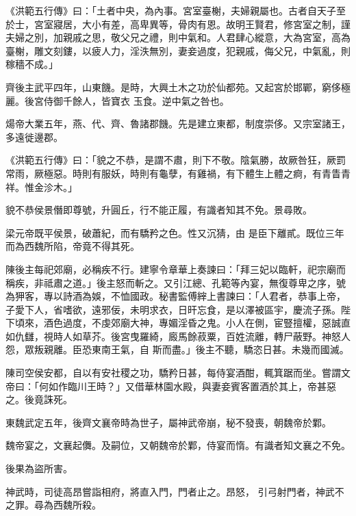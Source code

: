 \begin{pinyinscope}
 《洪範五行傳》曰：「土者中央，為內事。宮室臺榭，夫婦親屬也。古者自天子至於士，宮室寢居，大小有差，高卑異等，骨肉有恩。故明王賢君，修宮室之制，謹夫婦之別，加親戚之思，敬父兄之禮，則中氣和。人君肆心縱意，大為宮室，高為臺榭，雕文刻鏤，以疲人力，淫泆無別，妻妾過度，犯親戚，侮父兄，中氣亂，則稼穡不成。」



 齊後主武平四年，山東饑。是時，大興土木之功於仙都苑。又起宮於邯鄲，窮侈極麗。後宮侍御千餘人，皆寶衣
 玉食。逆中氣之咎也。



 煬帝大業五年，燕、代、齊、魯諸郡饑。先是建立東都，制度崇侈。又宗室諸王，多遠徙邊郡。



 《洪範五行傳》曰：「貌之不恭，是謂不肅，則下不敬。陰氣勝，故厥咎狂，厥罰常雨，厥極惡。時則有服妖，時則有龜孽，有雞禍，有下體生上體之痾，有青眚青祥。惟金沴木。」



 貌不恭侯景僭即尊號，升圓丘，行不能正履，有識者知其不免。景尋敗。



 梁元帝既平侯景，破蕭紀，而有驕矜之色。性又沉猜，由
 是臣下離貳。既位三年而為西魏所陷，帝竟不得其死。



 陳後主每祀郊廟，必稱疾不行。建寧令章華上奏諫曰：「拜三妃以臨軒，祀宗廟而稱疾，非祗肅之道。」後主怒而斬之。又引江總、孔範等內宴，無復尊卑之序，號為狎客，專以詩酒為娛，不恤國政。秘書監傅縡上書諫曰：「人君者，恭事上帝，子愛下人，省嗜欲，遠邪佞，未明求衣，日旰忘食，是以澤被區宇，慶流子孫。陛下頃來，酒色過度，不虔郊廟大神，專媚淫昏之鬼。小人在側，宦豎擅權，惡誠直如仇讎，視時人如草芥。後宮曳羅綺，廄馬餘菽粟，百姓流離，轉尸蔽野。神怒人怨，眾叛親離。臣恐東南王氣，自
 斯而盡。」後主不聽，驕恣日甚。未幾而國滅。



 陳司空侯安都，自以有安社稷之功，驕矜日甚，每侍宴酒酣，輒箕踞而坐。嘗謂文帝曰：「何如作臨川王時？」又借華林園水殿，與妻妾賓客置酒於其上，帝甚惡之。後竟誅死。



 東魏武定五年，後齊文襄帝時為世子，屬神武帝崩，秘不發喪，朝魏帝於鄴。



 魏帝宴之，文襄起儛。及嗣位，又朝魏帝於鄴，侍宴而惰。有識者知文襄之不免。



 後果為盜所害。



 神武時，司徒高昂嘗詣相府，將直入門，門者止之。昂怒，
 引弓射門者，神武不之罪。尋為西魏所殺。




\end{pinyinscope}
